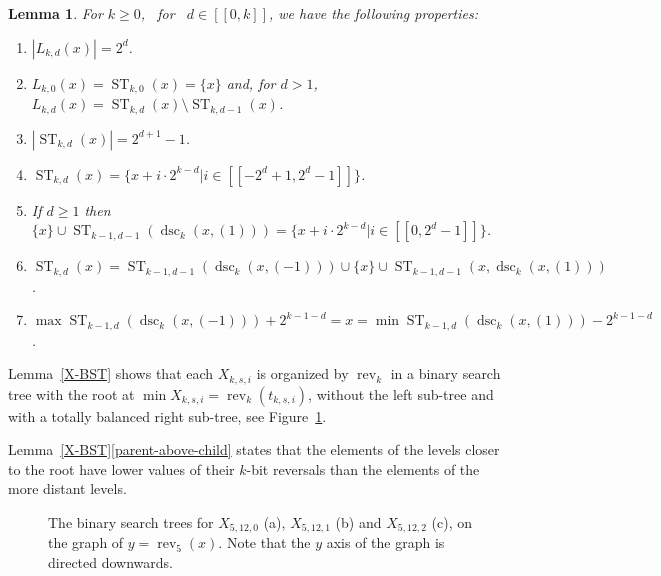 \documentclass{article}
\newcommand{\tmop}[1]{\ensuremath{\operatorname{#1}}}
\newenvironment{enumeratealpha}{\begin{enumerate}[a{\textup{)}}] }{\end{enumerate}}
\newtheorem{lemma}{Lemma}
\begin{document}
\begin{lemma}
  \label{BST-properties}For $k \geq 0$, \ for \ $d \in [[0, k]]$, we have the
  following properties:
  \begin{enumeratealpha}
    \item $|L_{k, d} (x) | = 2^d$.
    
    \item \label{BST-L-ST}$L_{k, 0} (x) = \tmop{ST}_{k, 0} (x) =\{x\}$ and,
    for $d > 1$, $L_{k, d} (x) = \tmop{ST}_{k, d} (x) \setminus \tmop{ST}_{k,
    d - 1} (x)$.
    
    \item $| \tmop{ST}_{k, d} (x) | = 2^{d + 1} - 1$.
    
    \item $\tmop{ST}_{k, d} (x) =\{x + i \cdot 2^{k - d} | i \in [[- 2^d + 1,
    2^d - 1]]\}$.
    
    \item \label{BST-with-right-ST}If $d \geq 1$ then $\{x\} \cup \tmop{ST}_{k
    - 1, d - 1} (\tmop{dsc}_k (x, (1))) =\{x + i \cdot 2^{k - d} | i \in [[0,
    2^d - 1]]\}$.
    
    \item \label{BST-ST-root-ST} $\tmop{ST}_{k, d} (x) = \tmop{ST}_{k - 1, d -
    1} (\tmop{dsc}_k (x, (- 1))) \cup \{x\} \cup \tmop{ST}_{k - 1, d - 1} (x,
    \tmop{dsc}_k (x, (1)))$.
    
    \item \label{BST-inorder} $\max \tmop{ST}_{k - 1, d} (\tmop{dsc}_k (x, (-
    1))) + 2^{k - 1 - d} = x = \min \tmop{ST}_{k - 1, d} (\tmop{dsc}_k (x,
    (1))) - 2^{k - 1 - d}$.
  \end{enumeratealpha}
\end{lemma}

Lemma~\ref{X-BST} shows that each $X_{k, s, i}$ is organized by $\tmop{rev}_k$
in a binary search tree with the root at $\min X_{k, s, i} = \tmop{rev}_k
(t_{k, s, i})$, without the left sub-tree and with a totally balanced right
sub-tree, see Figure~\ref{BST-fig}.

Lemma~\ref{X-BST}\ref{parent-above-child} states that the elements of the 
levels closer to the root
have lower values of their $k$-bit reversals than 
the elements of the more distant levels.

\begin{figure}[h]
  \caption{\label{BST-fig}The binary search trees for $X_{5, 12, 0}$ (a),
  $X_{5, 12, 1}$ (b) and $X_{5, 12, 2}$ (c), on the graph of $y = \tmop{rev}_5
  (x)$. Note that the $y$ axis of the graph is directed downwards.}
\end{figure}
\end{document}
